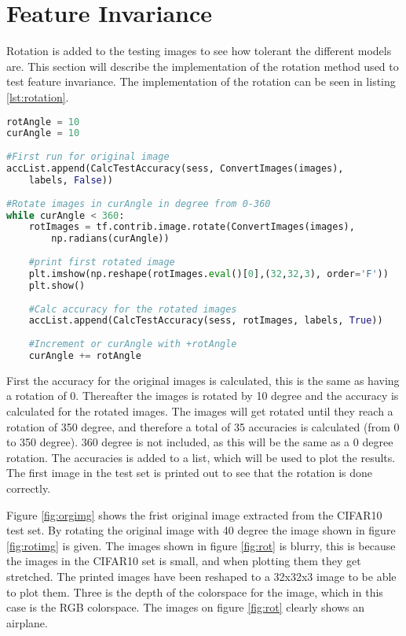 \section{Feature Invariance}

Rotation is added to the testing images to see how tolerant the different models are. This section will describe the implementation of the rotation method used to test feature invariance. The implementation of the rotation can be seen in listing \ref{lst:rotation}.

\begin{lstlisting}[language=Python, label=lst:rotation, caption=Rotate the images]
rotAngle = 10
curAngle = 10
    
#First run for original image
accList.append(CalcTestAccuracy(sess, ConvertImages(images), 
	labels, False))
    
#Rotate images in curAngle in degree from 0-360
while curAngle < 360:
	rotImages = tf.contrib.image.rotate(ConvertImages(images), 
		np.radians(curAngle))
        
	#print first rotated image
	plt.imshow(np.reshape(rotImages.eval()[0],(32,32,3), order='F'))
	plt.show()
        
	#Calc accuracy for the rotated images
	accList.append(CalcTestAccuracy(sess, rotImages, labels, True))
        
	#Increment or curAngle with +rotAngle
	curAngle += rotAngle
\end{lstlisting}

First the accuracy for the original images is calculated, this is the same as having a rotation of 0. Thereafter the images is rotated by 10 degree and the accuracy is calculated for the rotated images. The images will get rotated until they reach a rotation of 350 degree, and therefore a total of 35 accuracies is calculated (from 0 to 350 degree). 360 degree is not included, as this will be the same as a 0 degree rotation. The accuracies is added to a list, which will be used to plot the results. The first image in the test set is printed out to see that the rotation is done correctly.
\newline

Figure \ref{fig:orgimg} shows the frist original image extracted from the CIFAR10 test set. By rotating the original image with 40 degree the image shown in figure \ref{fig:rotimg} is given. The images shown in figure \ref{fig:rot} is blurry, this is because the images in the CIFAR10 set is small, and when plotting them they get stretched. The printed images have been reshaped to a 32x32x3 image to be able to plot them. Three is the depth of the colorspace for the image, which in this case is the RGB colorspace. The images on figure \ref{fig:rot} clearly shows an airplane. 


